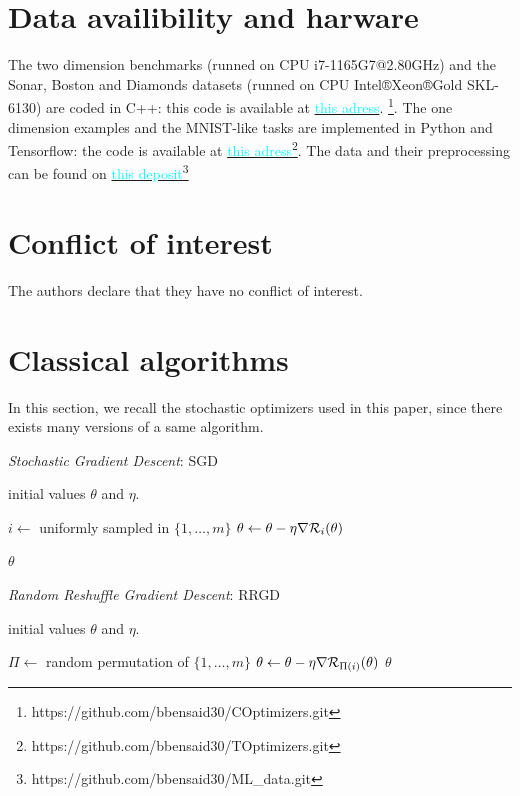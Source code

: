 \section*{Data availibility and harware}
The two dimension benchmarks (runned on CPU i7-1165G7@2.80GHz) and the Sonar, Boston and Diamonds datasets (runned on CPU Intel®Xeon®Gold SKL-6130) are coded in C++: this code is available at \href{https://github.com/bbensaid30/COptimizers.git}{\textcolor{cyan}{this adress}}.	\footnote{https://github.com/bbensaid30/COptimizers.git}. The one dimension examples and the MNIST-like tasks are implemented in Python and Tensorflow: the code is available at \href {https://github.com/bbensaid30/TOptimizers.git}{\textcolor{cyan}{this adress}}\footnote{https://github.com/bbensaid30/TOptimizers.git}. The data and their preprocessing can be found on \href{https://github.com/bbensaid30/ML_data.git}{\textcolor{cyan}{this deposit}}\footnote{https://github.com/bbensaid30/ML\_data.git}

\section*{Conflict of interest}
The authors declare that they have no conflict of interest.

\newpage

\appendix

\section{Classical algorithms}
\label{annexe_adam}

In this section, we recall the stochastic optimizers used in this paper, since there exists many versions of a same algorithm. 

\begin{algorithm}[h!]
	\caption{{\it Stochastic Gradient Descent}: SGD}
	\begin{algorithmic}
		\REQUIRE initial values $\theta$ and $\eta$.
		
		\STATE $i \leftarrow$ uniformly sampled in $\{1,\dots,m\}$
		\STATE $\theta \leftarrow \theta-\eta \nabla \mathcal{R}_i(\theta)$
		\ENDFOR
		
		\RETURN $\theta$
	\end{algorithmic}
	\label{algo_sgd}
\end{algorithm} 

\begin{algorithm}[h!]
	\caption{{\it Random Reshuffle Gradient Descent}: RRGD}
	\begin{algorithmic}
		\REQUIRE initial values $\theta$ and $\eta$.
		
		\FOR{$n=0, \dots, n_{max}-1$}
		\STATE $\Pi \leftarrow$ random permutation of $\{1,\dots,m\}$
		\FOR{$i=1, \dots, m$}
		\STATE $\theta \leftarrow \theta-\eta \nabla \mathcal{R}_{\Pi(i)}(\theta)$
		\ENDFOR
		\ENDFOR
		\RETURN $\theta$
	\end{algorithmic}
	\label{algo_RRGD}
\end{algorithm} 

